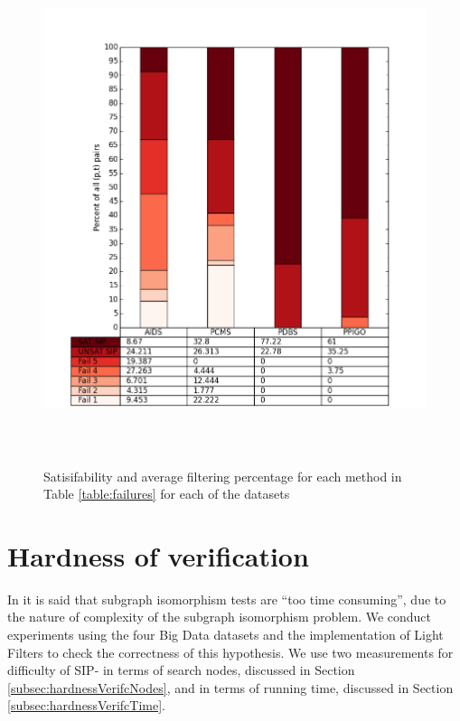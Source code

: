 \documentclass{l4proj}
\begin{document}

\begin{figure}
\centering
\includegraphics[height=15cm,width=13.5cm]{images/plots/splittedSIP.png}
\caption{Satisifability and average filtering percentage for each method in Table \ref{table:failures} for each of the datasets}
\label{averageFailures}
\end{figure}

\section{Hardness of verification}
\label{sec:sip1verificationeval}
In \cite{foteini} it is said that subgraph isomorphism tests are ``too time consuming'', due to the nature of complexity of the subgraph isomorphism problem. We conduct experiments using the four Big Data datasets and the implementation of Light Filters to check the correctness of this hypothesis. We use two measurements for difficulty of SIP- in terms of search nodes, discussed in Section \ref{subsec:hardnessVerifcNodes}, and in terms of running time, discussed in Section \ref{subsec:hardnessVerifcTime}. 
\end{document}
